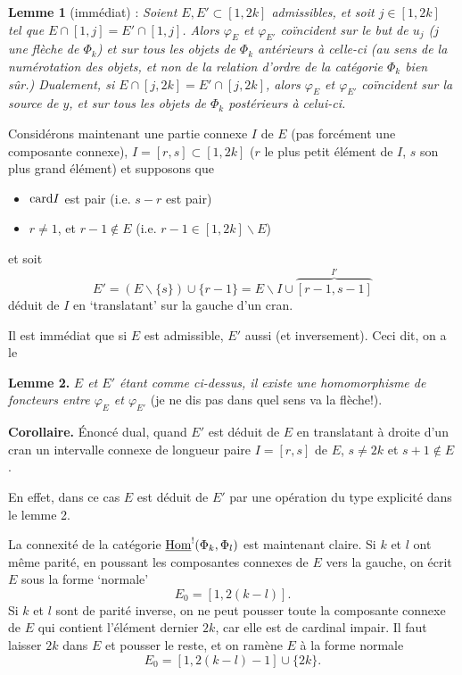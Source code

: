 \textbf{Lemme 1} (immédiat) : \textit{Soient $E,E'\subset[1,2k]$ admissibles, et soit $j\in[1,2k]$ tel que $E\cap[1,j]=E'\cap[1,j]$. Alors $\varphi_E$ et $\varphi_{E'}$ coïncident sur le but de $u_j$ ($j$ une flèche de $\Phi_k$) et sur tous les objets de $\Phi_k$ antérieurs à celle-ci (au sens de la numérotation des objets, et non de la relation d'ordre de la catégorie $\Phi_k$ bien sûr.) Dualement, si $E\cap[j,2k]=E'\cap[j,2k]$, alors $\varphi_E$ et $\varphi_{E'}$ coïncident sur la source de $y$, et sur tous les objets de $\Phi_k$ postérieurs à celui-ci.} %

Considérons maintenant une partie connexe $I$ de $E$ (pas forcément une composante connexe), $I=[r,s]\subset[1,2k]$ ($r$ le plus petit élément de $I$, $s$ son plus grand élément) et supposons que

\begin{itemize}
\item[a)] $\mathrm{card} I$ est pair (i.e. $s-r$ est pair)
\item[b)] $r\neq1$, et $r-1\notin E$ (i.e. $r-1\in[1,2k]\backslash E$)
\end{itemize}

et soit
\[
E'=(E\backslash\{s\})\cup\{r-1\}=E\backslash I\cup\overbrace{[r-1,s-1]}^{I'}
\]
déduit de $I$ en `translatant' sur la gauche d'un cran.

Il est immédiat que si $E$ est admissible, $E'$ aussi (et inversement). Ceci dit, on a le

\textbf{Lemme 2.} \textit{$E$ et $E'$ étant comme ci-dessus, il existe une homomorphisme de foncteurs entre $\varphi_E$ et $\varphi_{E'}$} (je ne dis pas dans quel sens va la flèche!). %

\textbf{Corollaire.} Énoncé dual, quand $E'$ est déduit de $E$ en translatant à droite d'un cran un intervalle connexe de longueur paire $I=[r,s]$ de $E$, $s\neq2k$ et $s+1\notin E$.

En effet, dans ce cas $E$ est déduit de $E'$ par une opération du type explicité dans le lemme 2.

La connexité de la catégorie $\underline{\mathrm{Hom}}^{!}(\Phi_k,\Phi_l)$ est maintenant claire. Si $k$ et $l$ ont même parité, en poussant les composantes connexes de $E$ vers la gauche, on écrit $E$ sous la forme `normale'
\[
E_0=[1,2(k-l)].
\]
Si $k$ et $l$ sont de parité inverse, on ne peut pousser toute la composante connexe de $E$ qui contient l'élément dernier $2k$, car elle est de cardinal impair. Il faut laisser $2k$ dans $E$ et pousser le reste, et on ramène $E$ à la forme normale
\[
E_0=[1,2(k-l)-1]\cup\{2k\}.
\]

